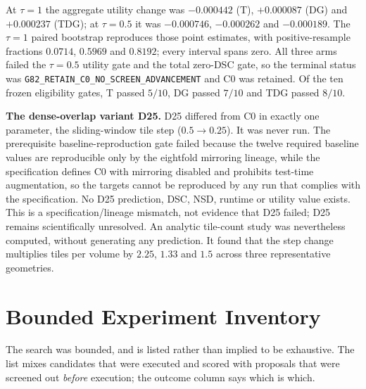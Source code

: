 \documentclass[runningheads]{llncs}
\begin{document}
\noindent At $\tau=1$ the aggregate utility change was $-0.000442$ (T), $+0.000087$ (DG) and
$+0.000237$ (TDG); at $\tau=0.5$ it was $-0.000746$, $-0.000262$ and $-0.000189$. The $\tau=1$ paired
bootstrap reproduces those point estimates, with positive-resample fractions $0.0714$, $0.5969$ and
$0.8192$; every interval spans zero. All three arms failed the $\tau=0.5$ utility gate and the total zero-DSC gate, so the
terminal status was \texttt{G82\_\allowbreak{}RETAIN\_\allowbreak{}C0\_\allowbreak{}NO\_\allowbreak{}SCREEN\_\allowbreak{}ADVANCEMENT} and C0 was retained. Of the ten frozen eligibility gates, T passed
$5/10$, DG passed $7/10$ and TDG passed $8/10$.

\medskip\noindent\textbf{The dense-overlap variant D25.} D25 differed from C0 in exactly one parameter, the sliding-window tile step ($0.5 \rightarrow 0.25$). It was never run. The prerequisite baseline-reproduction gate failed because the twelve required baseline values are reproducible only by the eightfold mirroring lineage, while the specification defines C0 with mirroring disabled and prohibits test-time augmentation, so the targets cannot be reproduced by any run that complies with the specification. No D25 prediction, DSC, NSD, runtime or utility value exists. This is a specification/lineage mismatch, not evidence that D25 failed; D25 remains scientifically unresolved. An analytic tile-count study was nevertheless computed, without generating any prediction. It found that the step change
multiplies tiles per volume by $2.25$, $1.33$ and $1.5$ across three representative geometries.


\section{Bounded Experiment Inventory}

The search was bounded, and is listed rather than implied to be exhaustive. The list mixes
candidates that were executed and scored with proposals that were screened out \emph{before}
execution; the outcome column says which is which.
\end{document}
